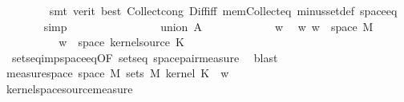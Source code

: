 \begin{isabellebody}
\ \ \ \ \ \ \ \isamarkupfalse%
\ {\isacharparenleft}{\kern0pt}smt\ {\isacharparenleft}{\kern0pt}verit{\isacharcomma}{\kern0pt}\ best{\isacharparenright}{\kern0pt}\ Collect{\isacharunderscore}{\kern0pt}cong\ Diff{\isacharunderscore}{\kern0pt}iff\ mem{\isacharunderscore}{\kern0pt}Collect{\isacharunderscore}{\kern0pt}eq\ minus{\isacharunderscore}{\kern0pt}set{\isacharunderscore}{\kern0pt}def\ space{\isacharunderscore}{\kern0pt}eq{\isacharparenright}{\kern0pt}\isanewline
\ \ \ \ \ \ \isamarkupfalse%
\ simp\ \isanewline
\ \ \ \ \ \ \isamarkupfalse%
\isanewline
\ \ \isamarkupfalse%
\isanewline
\ \ \ \ \isamarkupfalse%
\ {\isacharparenleft}{\kern0pt}union\ A{\isacharparenright}{\kern0pt}\isanewline
\ \ \ \ \isacommand{{\isacharbraceleft}{\kern0pt}}\isamarkupfalse%
\isanewline
\ \ \ \ \ \ \isamarkupfalse%
\ w\ \isamarkupfalse%
\ w{\isacharcolon}{\kern0pt}\ {\isachardoublequoteopen}w\ {\isasymin}\ space\ M{}{\isachardoublequoteclose}\isanewline
\ \ \ \ \ \ \isamarkupfalse%
\ \isamarkupfalse%
\ {\isachardoublequoteopen}{\isacharparenleft}{\kern0pt}{\isasymomega}\ w{\isacharparenright}{\kern0pt}\ {\isasymin}\ space\ {\isacharparenleft}{\kern0pt}kernel{\isacharunderscore}{\kern0pt}source\ K{\isacharparenright}{\kern0pt}{\isachardoublequoteclose}\isanewline
\ \ \ \ \ \ \ \ \isamarkupfalse%
\ {\isasymomega}\ sets{\isacharunderscore}{\kern0pt}eq{\isacharunderscore}{\kern0pt}imp{\isacharunderscore}{\kern0pt}space{\isacharunderscore}{\kern0pt}eq{\isacharbrackleft}{\kern0pt}OF\ sets{\isacharunderscore}{\kern0pt}eq{\isacharbrackright}{\kern0pt}\ space{\isacharunderscore}{\kern0pt}pair{\isacharunderscore}{\kern0pt}measure\ \isamarkupfalse%
\ blast\isanewline
\ \ \ \ \ \ \isamarkupfalse%
\ \isamarkupfalse%
\ {\isachardoublequoteopen}measure{\isacharunderscore}{\kern0pt}space\ {\isacharparenleft}{\kern0pt}space\ M{}{\isacharparenright}{\kern0pt}\ {\isacharparenleft}{\kern0pt}sets\ M{}{\isacharparenright}{\kern0pt}\ {\isacharparenleft}{\kern0pt}kernel\ K\ {\isacharparenleft}{\kern0pt}{\isasymomega}\ w{\isacharparenright}{\kern0pt}{\isacharparenright}{\kern0pt}{\isachardoublequoteclose}\isanewline
\ \ \ \ \ \ \ \ \isamarkupfalse%
\ kernel{\isachardot}{\kern0pt}space{\isacharunderscore}{\kern0pt}source{\isacharunderscore}{\kern0pt}measure\ \isamarkupfalse%

\end{isabellebody}
